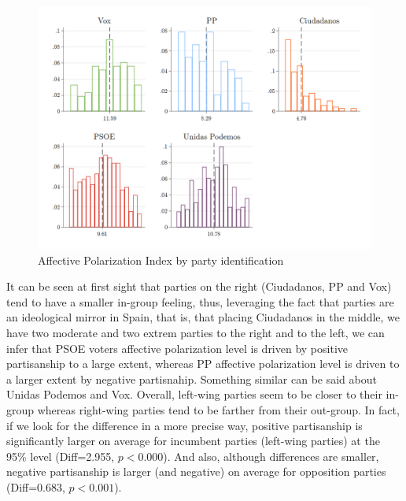 \documentclass[a4paper, svgnames]{article}
\begin{document}
\begin{figure}[H]
	\centering
	\includegraphics[width=\textwidth]{Figures/AP_index_by_party_id.png}
	\caption{\label{fig:AP_party_id} Affective Polarization Index by party identification}
\end{figure}

It can be seen at first sight that parties on the right (Ciudadanos, PP and Vox) tend to have a smaller in-group feeling, thus, leveraging the fact that parties are an ideological mirror in Spain, that is, that placing Ciudadanos in the middle, we have two moderate and two extrem parties to the right and to the left, we can infer that PSOE voters affective polarization level is driven by positive partisanship to a large extent, whereas PP affective polarization level is driven to a larger extent by negative partisnahip. Something similar can be said about Unidas Podemos and Vox. Overall, left-wing parties seem to be closer to their in-group whereas right-wing parties tend to be farther from their out-group. In fact, if we look for the difference in a more precise way, positive partisanship is significantly larger on average for incumbent parties (left-wing parties) at the 95\% level (Diff=2.955, $p<0.000$). And also, although differences are smaller, negative partisanship is larger (and negative) on average for opposition parties (Diff=0.683, $p<0.001$).
\end{document}
